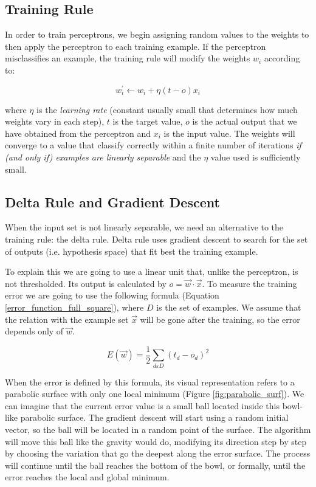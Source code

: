 	\subsection{Training Rule}
	In order to train perceptrons, we begin assigning random values to the weights to then apply the perceptron to each training example. If the perceptron misclassifies an example, the training rule will modify the weights $w_i$ according to:

	\begin{equation}
		\label{training_rule}
		w_{i}^{'} \leftarrow w_{i} + \eta (t - o) x_{i}
	\end{equation}

	where $\eta$ is the \textit{learning rate} (constant usually small that determines how much weights vary in each step), $t$ is the target value, $o$ is the actual output that we have obtained from the perceptron and $x_{i}$ is the input value. The weights will converge to a value that classify correctly within a finite number of iterations \textit{if (and only if) examples are linearly separable} and the $\eta$ value used is sufficiently small.
	
	\subsection{Delta Rule and Gradient Descent}
	When the input set is not linearly separable, we need an alternative to the training rule: the delta rule. Delta rule uses gradient descent to search for the set of outputs (i.e. hypothesis space) that fit best the training example. 

	To explain this we are going to use a linear unit that, unlike the perceptron, is not thresholded. Its output is calculated by $o = \vec{w} \cdot \vec{x}$. To measure the training error we are going to use the following formula (Equation \ref{error_function_full_square}), where $D$ is the set of examples. We assume that the relation with the example set $\vec{x}$ will be gone after the training, so the error depends only of $\vec{w}$.

	\begin{equation}
		\label{error_function_full_square}
		E(\vec{w}) = \frac{1}{2} \sum_{d \varepsilon D} (t_d-o_d)^2 
	\end{equation}

	When the error is defined by this formula, its visual representation refers to a parabolic surface with only one local minimum (Figure \ref{fig:parabolic_surf}). We can imagine that the current error value is a small ball located inside this bowl-like parabolic surface. The gradient descent will start using a random initial vector, so the ball will be located in a random point of the surface. The algorithm will move this ball like the gravity would do, modifying its direction step by step by choosing the variation that go the deepest along the error surface. The process will continue until the ball reaches the bottom of the bowl, or formally, until the error reaches the local and global minimum.

